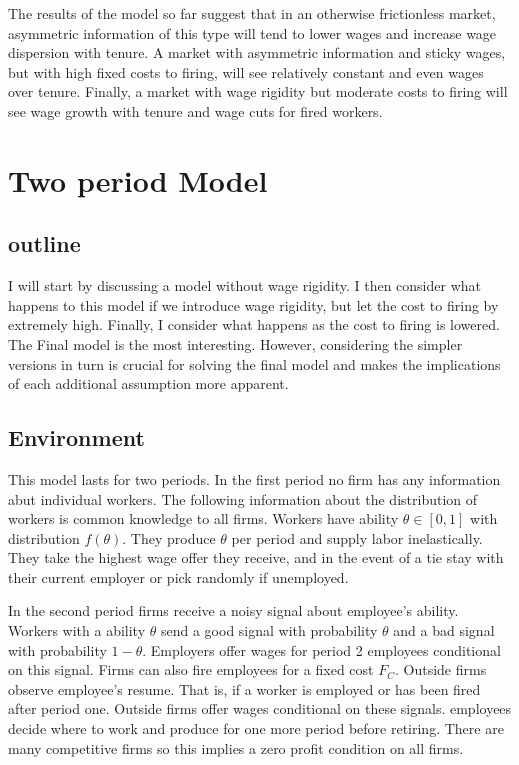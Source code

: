 \documentclass[11pt]{article}
\begin{document}
	The results of the model so far suggest that in an otherwise frictionless market, asymmetric information of this type will tend to lower wages and increase wage dispersion with tenure. A market with asymmetric information and sticky wages, but with high fixed costs to firing, will see relatively constant and even wages over tenure. Finally, a market with wage rigidity but moderate costs to firing will see wage growth with tenure and wage cuts for fired workers. 





	\section{ Two period Model}
	\subsection{outline}
	
	I will start by discussing a model without wage rigidity. I then consider what happens to this model if we introduce wage rigidity, but let the cost to firing by extremely high. Finally, I consider what happens as the cost to firing is lowered. The Final model is the most interesting. However, considering the simpler versions in turn is crucial for solving the final model and makes the implications of each additional assumption more apparent.  
	\subsection{Environment}
	
	This model lasts for two periods. In the first period no firm has any information abut individual workers. The following information about the distribution of workers is common knowledge to all firms. Workers have ability $\theta \in [0,1]$ with distribution $f(\theta)$. They produce $\theta$ per period and supply labor inelastically. They take the highest wage offer they receive, and in the event of a tie stay with their current employer or pick randomly if unemployed. \par
	
	In the second period firms receive a noisy signal about employee's ability. Workers with a ability $\theta$ send a good signal with probability $\theta$ and a bad signal with probability $1-\theta$. Employers offer wages for period 2 employees conditional on this signal. Firms can also fire employees for a fixed cost $F_C$. Outside firms observe employee's resume. That is, if a worker is employed or has been fired after period one. Outside firms offer wages conditional on these signals. employees decide where to work and produce for one more period before retiring. There are many competitive firms so this implies a zero profit condition on all firms. \par 
	
\end{document}
